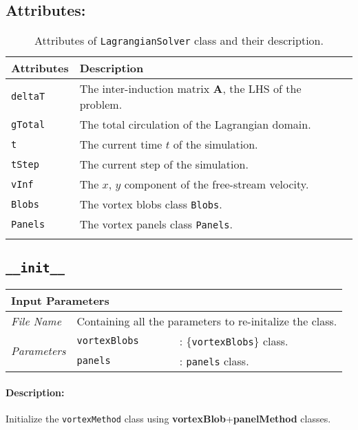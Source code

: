 \subsection*{Attributes:}
\begingroup
\footnotesize
\begin{longtable}{|l|p{12cm}|}
	\hline
	\textbf{Attributes} & \textbf{Description}\\
	\toprule
    \texttt{deltaT}     & The inter-induction matrix $\mathbf{A}$, the LHS of the problem. \\ \hline
    \texttt{gTotal}     & The total circulation of the Lagrangian domain. \\ \hline    
	\texttt{t} & The current time $t$ of the simulation.\\          \hline
	\texttt{tStep} & The current step of the simulation.\\          \hline
	\texttt{vInf} & The $x$, $y$ component of the free-stream velocity.\\          \hline	
	\texttt{Blobs} & The vortex blobs class \texttt{Blobs}.\\          \hline	
	\texttt{Panels} & The vortex panels class \texttt{Panels}.\\          \hline			
                      
    \caption{Attributes of \texttt{LagrangianSolver} class and their description.}
    \label{tab:attributesLagrangianSolver}
\end{longtable}
\endgroup


\subsection*{\texttt{\_\_init\_\_}}
	\begin{tabular}{l|lp{7cm}}
		\multicolumn{2}{l}{\textbf{Input Parameters}} & \\ \hline
		\textit{File Name} & \multicolumn{2}{l}{Containing all the parameters to re-initalize the class.} \\ \hline
		\multirow{2}{*}{\textit{Parameters}} & \texttt{vortexBlobs} &: \{\texttt{vortexBlobs}\} class. \\ \cline{2-3}
		& \texttt{panels} &: \texttt{panels} class. \\ \cline{2-3}
	\end{tabular}
	\paragraph{Description:} Initialize the \texttt{vortexMethod} class using \textbf{vortexBlob}+\textbf{panelMethod} classes.
